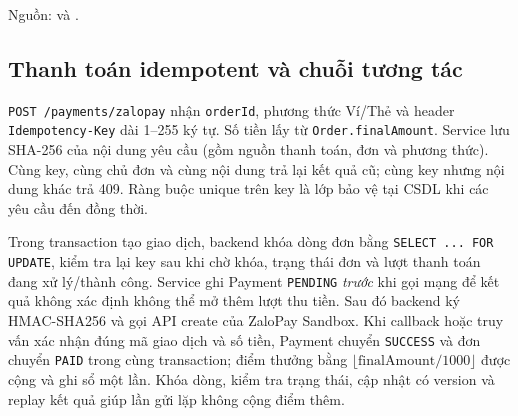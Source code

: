 Nguồn:  và .

\subsection{Thanh toán idempotent và chuỗi tương tác}

\texttt{POST /payments/zalopay} nhận \texttt{orderId}, phương thức Ví/Thẻ và header \texttt{Idempotency-Key} dài 1--255 ký tự. Số tiền lấy từ \texttt{Order.finalAmount}. Service lưu SHA-256 của nội dung yêu cầu (gồm nguồn thanh toán, đơn và phương thức). Cùng key, cùng chủ đơn và cùng nội dung trả lại kết quả cũ; cùng key nhưng nội dung khác trả 409. Ràng buộc unique trên key là lớp bảo vệ tại CSDL khi các yêu cầu đến đồng thời.

Trong transaction tạo giao dịch, backend khóa dòng đơn bằng \texttt{SELECT ... FOR UPDATE}, kiểm tra lại key sau khi chờ khóa, trạng thái đơn và lượt thanh toán đang xử lý/thành công. Service ghi Payment \texttt{PENDING} \emph{trước} khi gọi mạng để kết quả không xác định không thể mở thêm lượt thu tiền. Sau đó backend ký HMAC-SHA256 và gọi API create của ZaloPay Sandbox. Khi callback hoặc truy vấn xác nhận đúng mã giao dịch và số tiền, Payment chuyển \texttt{SUCCESS} và đơn chuyển \texttt{PAID} trong cùng transaction; điểm thưởng bằng $\lfloor\mathrm{finalAmount}/1000\rfloor$ được cộng và ghi sổ một lần. Khóa dòng, kiểm tra trạng thái, cập nhật có version và replay kết quả giúp lần gửi lặp không cộng điểm thêm.

